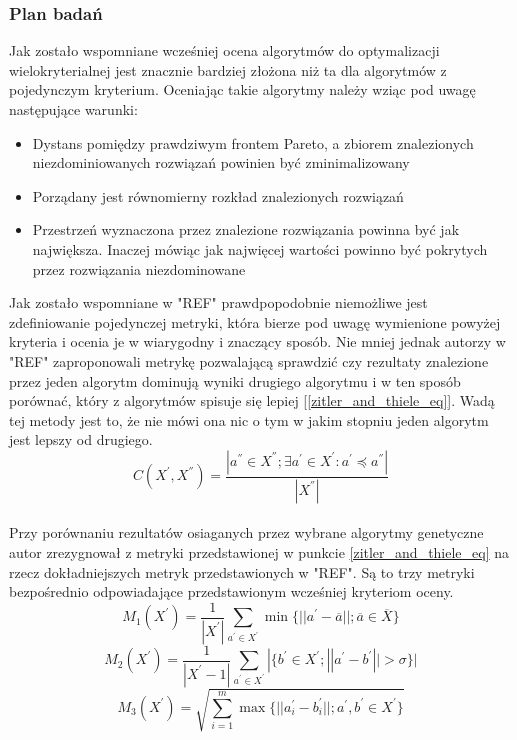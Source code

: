 \documentclass[twoside]{iisthesis}
\begin{document}
\subsubsection{Plan badań}
Jak zostało wspomniane wcześniej ocena algorytmów do optymalizacji wielokryterialnej jest znacznie bardziej złożona niż ta dla algorytmów z pojedynczym kryterium. Oceniając takie algorytmy należy wziąc pod uwagę następujące warunki:
\begin{itemize}
	\item Dystans pomiędzy prawdziwym frontem Pareto, a zbiorem znalezionych niezdominiowanych rozwiązań powinien być zminimalizowany
	\item Porządany jest równomierny rozkład znalezionych rozwiązań
	\item Przestrzeń wyznaczona przez znalezione rozwiązania powinna być jak największa. Inaczej mówiąc jak najwięcej wartości powinno być pokrytych przez rozwiązania niezdominowane
\end{itemize}
Jak zostało wspomniane w "REF" prawdpopodobnie niemożliwe jest zdefiniowanie pojedynczej metryki, która bierze pod uwagę wymienione powyżej kryteria i ocenia je w wiarygodny i znaczący sposób. Nie mniej jednak autorzy w "REF" zaproponowali metrykę pozwalającą sprawdzić czy rezultaty znalezione przez jeden algorytm dominują wyniki drugiego algorytmu i w ten sposób porównać, który z algorytmów spisuje się lepiej [\ref{zitler_and_thiele_eq}]. Wadą tej metody jest to, że nie mówi ona nic o tym w jakim stopniu jeden algorytm jest lepszy od drugiego.\\

\begin{equation}
\label{zitler_and_thiele_eq}
C(X^{'}, X^{''}) = \dfrac{|a^{''} \in X^{''}; \exists a^{'} \in X^{'}: a^{'} \preceq a^{''	}|}{|X^{''}|}
\end{equation}
\\
Przy porównaniu rezultatów osiaganych przez wybrane algorytmy genetyczne autor zrezygnował z metryki przedstawionej w punkcie \ref{zitler_and_thiele_eq} na rzecz dokładniejszych metryk przedstawionych w "REF". Są to trzy metryki bezpośrednio odpowiadające przedstawionym wcześniej kryteriom oceny.
\begin{equation}
M_{1}(X^{'}) = \dfrac{1}{|X^{'}|}\sum_{a^{'} \in X^{'}}^{} \min \{{||a^{'} - \overline{a}||;\overline{a} \in \overline{X}}\}
\end{equation}
\begin{equation}
M_{2}(X^{'}) = \dfrac{1}{|X^{'} - 1|} \sum_{a^{'} \in X^{'}}^{} |\{b^{'} \in X^{'}; ||a^{'} - b^{'}|| > \sigma\}|
\end{equation}
\begin{equation}
M_{3}(X^{'}) = \sqrt{\sum_{i = 1}^{m} \max \{||a_{i}^{'} - b_{i}^{'}||;a^{'}, b^{'} \in X^{'}\}}
\end{equation}
\end{document}
